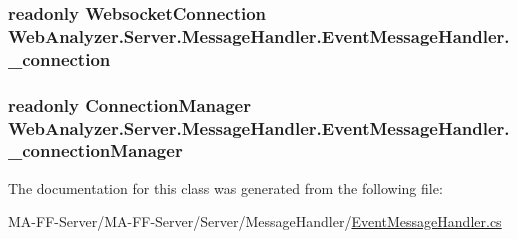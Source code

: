 \subsubsection[{\+\_\+connection}]{\setlength{\rightskip}{0pt plus 5cm}readonly {\bf Websocket\+Connection} Web\+Analyzer.\+Server.\+Message\+Handler.\+Event\+Message\+Handler.\+\_\+connection\hspace{0.3cm}{\ttfamily [private]}}\label{class_web_analyzer_1_1_server_1_1_message_handler_1_1_event_message_handler_ab818f2be9cb81fd8854221cc1906d736}
\hypertarget{class_web_analyzer_1_1_server_1_1_message_handler_1_1_event_message_handler_ada36000f38728c974d1cbebc7f716936}{}
\subsubsection[{\+\_\+connection\+Manager}]{\setlength{\rightskip}{0pt plus 5cm}readonly {\bf Connection\+Manager} Web\+Analyzer.\+Server.\+Message\+Handler.\+Event\+Message\+Handler.\+\_\+connection\+Manager\hspace{0.3cm}{\ttfamily [private]}}\label{class_web_analyzer_1_1_server_1_1_message_handler_1_1_event_message_handler_ada36000f38728c974d1cbebc7f716936}


The documentation for this class was generated from the following file\+:\begin{DoxyCompactItemize}
\item 
M\+A-\/\+F\+F-\/\+Server/\+M\+A-\/\+F\+F-\/\+Server/\+Server/\+Message\+Handler/\hyperlink{_event_message_handler_8cs}{Event\+Message\+Handler.\+cs}\end{DoxyCompactItemize}
